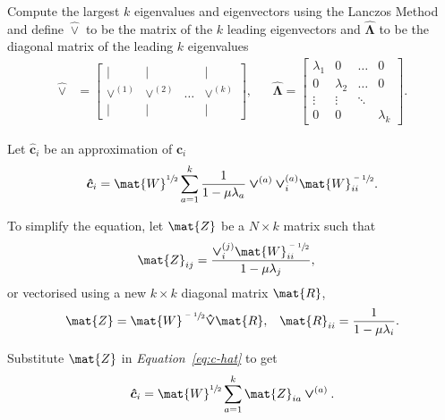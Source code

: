 \documentclass[12pt]{report}
\begin{document}
Compute the largest $k$ eigenvalues and eigenvectors using the Lanczos Method
and define $\bm{\hat{\vee}}$ to be the matrix of the $k$ leading eigenvectors
and $\bm{\hat{\Lambda}}$ to be the diagonal matrix of the leading $k$
eigenvalues
\begin{align}
  \bm{\hat{\vee}} &= \begin{bmatrix}
    \vert           & \vert           &       & \vert \\
    \bm{\vee}^{(1)} & \bm{\vee}^{(2)} & \dots & \bm{\vee}^{(k)} \\
    \vert           & \vert           &       & \vert \end{bmatrix}, &&
  \bm{\hat{\Lambda}} = \begin{bmatrix}
    \lambda_1 & 0 		      & \dots  & 0 \\
    0 	 	    & \lambda_2   & \dots  & 0 \\
    \vdots 	  & \vdots	    & \ddots &   \\
    0	        & 0           &        & \lambda_k
  \end{bmatrix}.
\end{align}


Let $\bm{\hat{c}}_i$ be an approximation of $\bm{c}_i$
\begin{equation}
  \label{eq:c-hat}
  \bm{\hat{c}}_i = \mat{W}^{\sfrac{1}{2}} \sum_{a=1}^{k} \frac{1}{1 - \mu
    \lambda_a} \bm{\vee}^{(a)} \bm{\vee}^{(a)}_i \mat{W}^{\sfrac{-1}{2}}_{ii}.
\end{equation}


%
%


To simplify the equation, let $\mat{Z}$ be a $N \times k$ matrix such that
\begin{align}
  \label{eq:z-ij}
  \mat{Z}_{ij} &= \frac{\bm{\vee}^{(j)}_i \mat{W}^{\sfrac{-1}{2}}_{ii}}
    {1-\mu \lambda_j},
\end{align}
or vectorised using a new $k \times k$ diagonal matrix $\mat{R}$,
\begin{align}
  \label{eq:z-vectorised}
  \mat{Z} = \mat{W}^{\sfrac{-1}{2}} \bm{\hat{\vee}} \mat{R}, &&
  \mat{R}_{ii} = \frac{1}{1 - \mu \lambda_i}.
\end{align}

Substitute $\mat{Z}$ in \emph{Equation~\ref{eq:c-hat}} to get
\begin{equation}
  \label{eq:ci-rearranged-z}
  \bm{\hat{c}}_i = \mat{W}^{\sfrac{1}{2}} \sum_{a=1}^{k} \mat{Z}_{ia}
    \bm{\vee}^{(a)}.
\end{equation}
\end{document}
